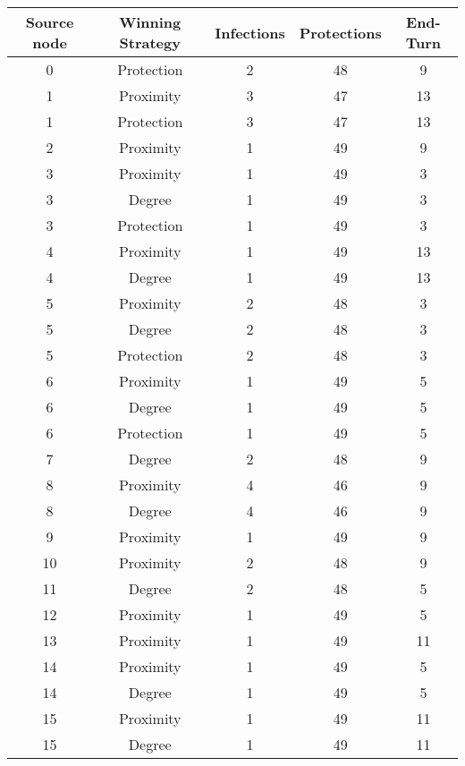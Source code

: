 \documentclass[results.tex]{subfiles}
\begin{document}
\begin{center}
  \begin{tabular}{| c || c | c | c | c |}
    \hline
    {\bfseries Source node} & {\bfseries Winning Strategy} & {\bfseries Infections} & {\bfseries Protections} & {\bfseries End-Turn} \\  %
    \hline\hline
    0 & Protection & 2 & 48 & 9 \\ 
    \hline
    1 & Proximity & 3 & 47 & 13 \\ 
    \hline
    1 & Protection & 3 & 47 & 13 \\ 
    \hline
    2 & Proximity & 1 & 49 & 9 \\ 
    \hline
    3 & Proximity & 1 & 49 & 3 \\ 
    \hline
    3 & Degree & 1 & 49 & 3 \\ 
    \hline
    3 & Protection & 1 & 49 & 3 \\ 
    \hline
    4 & Proximity & 1 & 49 & 13 \\ 
    \hline
    4 & Degree & 1 & 49 & 13 \\ 
    \hline
    5 & Proximity & 2 & 48 & 3 \\ 
    \hline
    5 & Degree & 2 & 48 & 3 \\ 
    \hline
    5 & Protection & 2 & 48 & 3 \\ 
    \hline
    6 & Proximity & 1 & 49 & 5 \\ 
    \hline
    6 & Degree & 1 & 49 & 5 \\ 
    \hline
    6 & Protection & 1 & 49 & 5 \\ 
    \hline
    7 & Degree & 2 & 48 & 9 \\ 
    \hline
    8 & Proximity & 4 & 46 & 9 \\ 
    \hline
    8 & Degree & 4 & 46 & 9 \\ 
    \hline
    9 & Proximity & 1 & 49 & 9 \\ 
    \hline
    10 & Proximity & 2 & 48 & 9 \\ 
    \hline
    11 & Degree & 2 & 48 & 5 \\ 
    \hline
    12 & Proximity & 1 & 49 & 5 \\ 
    \hline
    13 & Proximity & 1 & 49 & 11 \\ 
    \hline
    14 & Proximity & 1 & 49 & 5 \\ 
    \hline
    14 & Degree & 1 & 49 & 5 \\ 
    \hline
    15 & Proximity & 1 & 49 & 11 \\ 
    \hline
    15 & Degree & 1 & 49 & 11 \\ 

\end{tabular}
\end{center}
\end{document}

